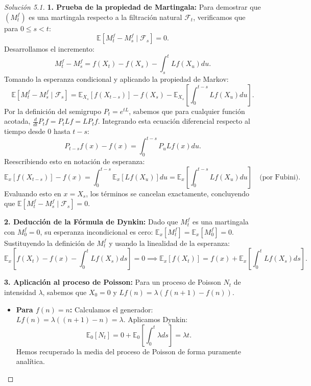 \documentclass[10pt,a4paper]{article}
\begin{document}
\begin{proof}[Solución 5.1]
    \textbf{1. Prueba de la propiedad de Martingala:}
    Para demostrar que $(M_t^f)$ es una martingala respecto a la filtración natural $\mathcal{F}_t$, verificamos que para $0 \le s < t$:
    \[ \mathbb{E}[M_t^f - M_s^f \mid \mathcal{F}_s] = 0. \]
    Desarrollamos el incremento:
    \[ M_t^f - M_s^f = f(X_t) - f(X_s) - \int_s^t Lf(X_u) du. \]
    Tomando la esperanza condicional y aplicando la propiedad de Markov:
    \[ \mathbb{E}[M_t^f - M_s^f \mid \mathcal{F}_s] = \mathbb{E}_{X_s}[f(X_{t-s})] - f(X_s) - \mathbb{E}_{X_s} \left[ \int_0^{t-s} Lf(X_u) du \right]. \]
    Por la definición del semigrupo $P_t = e^{tL}$, sabemos que para cualquier función acotada, $\frac{d}{dt}P_t f = P_t Lf = L P_t f$. Integrando esta ecuación diferencial respecto al tiempo desde $0$ hasta $t-s$:
    \[ P_{t-s}f(x) - f(x) = \int_0^{t-s} P_u Lf(x) du. \]
    Reescribiendo esto en notación de esperanza:
    \[ \mathbb{E}_x[f(X_{t-s})] - f(x) = \int_0^{t-s} \mathbb{E}_x[Lf(X_u)] du = \mathbb{E}_x \left[ \int_0^{t-s} Lf(X_u) du \right] \quad \text{(por Fubini)}. \]
    Evaluando esto en $x = X_s$, los términos se cancelan exactamente, concluyendo que $\mathbb{E}[M_t^f - M_s^f \mid \mathcal{F}_s] = 0$.

    \textbf{2. Deducción de la Fórmula de Dynkin:}
    Dado que $M_t^f$ es una martingala con $M_0^f = 0$, su esperanza incondicional es cero: $\mathbb{E}_x[M_t^f] = \mathbb{E}_x[M_0^f] = 0$.
    Sustituyendo la definición de $M_t^f$ y usando la linealidad de la esperanza:
    \[ \mathbb{E}_x \left[ f(X_t) - f(x) - \int_0^t Lf(X_s) ds \right] = 0 \implies \mathbb{E}_x[f(X_t)] = f(x) + \mathbb{E}_x \left[ \int_0^t Lf(X_s) ds \right]. \]

    \textbf{3. Aplicación al proceso de Poisson:}
    Para un proceso de Poisson $N_t$ de intensidad $\lambda$, sabemos que $X_0 = 0$ y $Lf(n) = \lambda(f(n+1) - f(n))$.
    \begin{itemize}
        \item \textbf{Para $f(n) = n$:}
        Calculamos el generador: $Lf(n) = \lambda((n+1) - n) = \lambda$.
        Aplicamos Dynkin:
        \[ \mathbb{E}_0[N_t] = 0 + \mathbb{E}_0 \left[ \int_0^t \lambda ds \right] = \lambda t. \]
        Hemos recuperado la media del proceso de Poisson de forma puramente analítica.
        

\end{itemize}
\end{proof}
\end{document}
